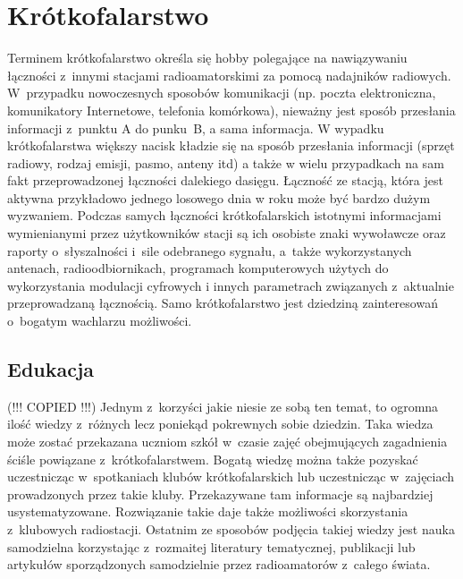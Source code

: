 \documentclass[]{mgr}
\begin{document}
        \section{Krótkofalarstwo}
        Terminem krótkofalarstwo określa się hobby polegające na nawiązywaniu łączności z~innymi stacjami radioamatorskimi za pomocą nadajników radiowych. W~przypadku nowoczesnych sposobów komunikacji (np. poczta elektroniczna, komunikatory Internetowe, telefonia komórkowa), nieważny jest sposób przesłania informacji z~punktu A do punku~B, a sama informacja. W wypadku krótkofalarstwa większy nacisk kładzie się na sposób przesłania informacji (sprzęt radiowy, rodzaj emisji, pasmo, anteny itd) a także w wielu przypadkach na sam fakt przeprowadzonej łączności dalekiego dasięgu. Łączność ze stacją, która jest aktywna przykładowo jednego losowego dnia w roku może być bardzo dużym wyzwaniem. Podczas samych łączności krótkofalarskich istotnymi informacjami wymienianymi przez użytkowników stacji są ich osobiste znaki wywoławcze oraz raporty o~słyszalności i~sile odebranego sygnału, a~także wykorzystanych antenach, radioodbiornikach, programach komputerowych użytych do wykorzystania modulacji cyfrowych i innych parametrach związanych z~aktualnie przeprowadzaną łącznością. Samo krótkofalarstwo jest dziedziną zainteresowań o~bogatym wachlarzu możliwości.

            \subsection{Edukacja}
            (!!! COPIED !!!) Jednym z~korzyści jakie niesie ze sobą ten temat, to ogromna ilość wiedzy z~różnych lecz poniekąd pokrewnych sobie dziedzin. Taka wiedza może zostać przekazana uczniom szkół w~czasie zajęć obejmujących zagadnienia ściśle powiązane z~krótkofalarstwem. Bogatą wiedzę można także pozyskać uczestnicząc w~spotkaniach klubów krótkofalarskich lub uczestnicząc w~zajęciach prowadzonych przez takie kluby. Przekazywane tam informacje są najbardziej usystematyzowane. Rozwiązanie takie daje także możliwości skorzystania z~klubowych radiostacji. Ostatnim ze sposobów podjęcia takiej wiedzy jest nauka samodzielna korzystając z~rozmaitej literatury tematycznej, publikacji lub artykułów sporządzonych samodzielnie przez radioamatorów z~całego świata.
\end{document}
